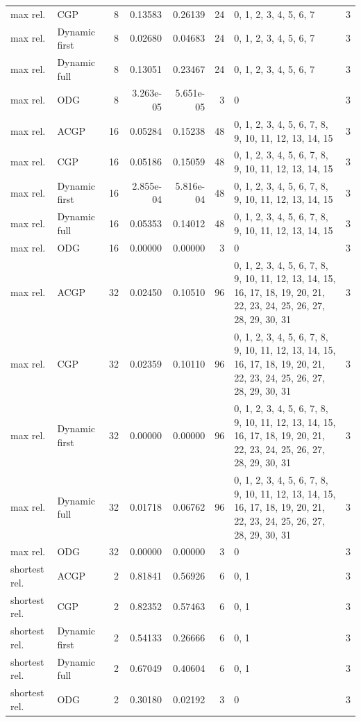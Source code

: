 \documentclass[10pt,a4paper]{article}
\begin{document}
\begin{longtable}{@{}p{23mm}p{29mm}rrrrp{36mm}r@{}}
max rel. & CGP & 8 & 0.13583 & 0.26139 & 24 & 0, 1, 2, 3, 4, 5, 6, 7 & 3 \\
max rel. & Dynamic first & 8 & 0.02680 & 0.04683 & 24 & 0, 1, 2, 3, 4, 5, 6, 7 & 3 \\
max rel. & Dynamic full & 8 & 0.13051 & 0.23467 & 24 & 0, 1, 2, 3, 4, 5, 6, 7 & 3 \\
max rel. & ODG & 8 & 3.263e-05 & 5.651e-05 & 3 & 0 & 3 \\
max rel. & ACGP & 16 & 0.05284 & 0.15238 & 48 & 0, 1, 2, 3, 4, 5, 6, 7, 8, 9, 10, 11, 12, 13, 14, 15 & 3 \\
max rel. & CGP & 16 & 0.05186 & 0.15059 & 48 & 0, 1, 2, 3, 4, 5, 6, 7, 8, 9, 10, 11, 12, 13, 14, 15 & 3 \\
max rel. & Dynamic first & 16 & 2.855e-04 & 5.816e-04 & 48 & 0, 1, 2, 3, 4, 5, 6, 7, 8, 9, 10, 11, 12, 13, 14, 15 & 3 \\
max rel. & Dynamic full & 16 & 0.05353 & 0.14012 & 48 & 0, 1, 2, 3, 4, 5, 6, 7, 8, 9, 10, 11, 12, 13, 14, 15 & 3 \\
max rel. & ODG & 16 & 0.00000 & 0.00000 & 3 & 0 & 3 \\
max rel. & ACGP & 32 & 0.02450 & 0.10510 & 96 & 0, 1, 2, 3, 4, 5, 6, 7, 8, 9, 10, 11, 12, 13, 14, 15, 16, 17, 18, 19, 20, 21, 22, 23, 24, 25, 26, 27, 28, 29, 30, 31 & 3 \\
max rel. & CGP & 32 & 0.02359 & 0.10110 & 96 & 0, 1, 2, 3, 4, 5, 6, 7, 8, 9, 10, 11, 12, 13, 14, 15, 16, 17, 18, 19, 20, 21, 22, 23, 24, 25, 26, 27, 28, 29, 30, 31 & 3 \\
max rel. & Dynamic first & 32 & 0.00000 & 0.00000 & 96 & 0, 1, 2, 3, 4, 5, 6, 7, 8, 9, 10, 11, 12, 13, 14, 15, 16, 17, 18, 19, 20, 21, 22, 23, 24, 25, 26, 27, 28, 29, 30, 31 & 3 \\
max rel. & Dynamic full & 32 & 0.01718 & 0.06762 & 96 & 0, 1, 2, 3, 4, 5, 6, 7, 8, 9, 10, 11, 12, 13, 14, 15, 16, 17, 18, 19, 20, 21, 22, 23, 24, 25, 26, 27, 28, 29, 30, 31 & 3 \\
max rel. & ODG & 32 & 0.00000 & 0.00000 & 3 & 0 & 3 \\
shortest rel. & ACGP & 2 & 0.81841 & 0.56926 & 6 & 0, 1 & 3 \\
shortest rel. & CGP & 2 & 0.82352 & 0.57463 & 6 & 0, 1 & 3 \\
shortest rel. & Dynamic first & 2 & 0.54133 & 0.26666 & 6 & 0, 1 & 3 \\
shortest rel. & Dynamic full & 2 & 0.67049 & 0.40604 & 6 & 0, 1 & 3 \\
shortest rel. & ODG & 2 & 0.30180 & 0.02192 & 3 & 0 & 3 \\

\end{longtable}
\end{document}
